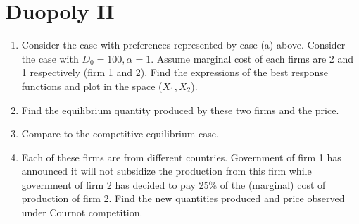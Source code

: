 \documentclass[11pt, oneside,french]{article}   	%
\begin{document}
\section{Duopoly II}

\begin{enumerate}
    \item Consider the case with preferences represented by case (a) above. Consider the case with $D_0 = 100,\alpha=1$. Assume marginal cost of each firms are 2 and 1 respectively (firm 1 and 2). Find the expressions of the best response functions and plot in the space ($X_1,X_2$). 
    \item Find the equilibrium quantity produced by these two firms and the price. 
    \item Compare to the competitive equilibrium case. 
    \item Each of these firms are from different countries. Government of firm 1 has announced it will not subsidize the production from this firm while government of firm 2 has decided to pay 25\% of the (marginal) cost of production of firm 2. Find the new quantities produced and price observed under Cournot competition. 
\end{enumerate}
\end{document}

